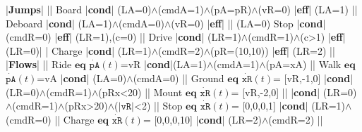     |\textbf{Jumps}| |\vspace{1pt}|
    Board   |\textbf{cond}| (LA=0)$\land$(cmdA=1)$\land$(pA=pR)$\land$(vR=0) |\textbf{eff}| (LA=1) |\vspace{1pt}|
    Deboard |\textbf{cond}| (LA=1)$\land$(cmdA=0)$\land$(vR=0) |\textbf{eff}| |\vspace{1pt}| (LA=0)
    Stop    |\textbf{cond}| (cmdR=0) |\textbf{eff}| (LR=1),(c=0) |\vspace{1pt}|
    Drive   |\textbf{cond}| (LR=1)$\land$(cmdR=1)$\land$(c>1) |\textbf{eff}| (LR=0)| \vspace{1pt}|
    Charge  |\textbf{cond}| (LR=1)$\land$(cmdR=2)$\land$(pR=(10,10)) |\textbf{eff}| (LR=2) |\vspace{1pt}|
    |\textbf{Flows}| |\vspace{1pt}|
    Ride   $\textbf{eq}$ $\dot{\texttt{pA}}(t)$=vR |\textbf{cond}|(LA=1)$\land$(cmdA=1)$\land$(pA=xA) |\vspace{1pt}|
    Walk   $\textbf{eq}$ $\dot{\texttt{pA}}(t)$=vA |\textbf{cond}| (LA=0)$\land$(cmdA=0) |\vspace{1pt}|
    Ground $\textbf{eq}$ $\dot{\texttt{xR}}(t)$= [vR,-1,0] |\textbf{cond}| (LR=0)$\land$(cmdR=1)$\land$(pRx<20) |\vspace{1pt}|
    Mount  $\textbf{eq}$ $\dot{\texttt{xR}}(t)$= [vR,-2,0] |\vspace{1pt}| |\textbf{cond}| (LR=0)$\land$(cmdR=1)$\land$(pRx>20)$\land$($|\texttt{vR}|$<2) |\vspace{1pt}|
    Stop   $\textbf{eq}$ $\dot{\texttt{xR}}(t)$= [0,0,0,1] |\textbf{cond}| (LR=1)$\land$(cmdR=0) |\vspace{1pt}|
    Charge $\textbf{eq}$ $\dot{\texttt{xR}}(t)$= [0,0,0,10] |\textbf{cond}| (LR=2)$\land$(cmdR=2) |\vspace{1pt}|